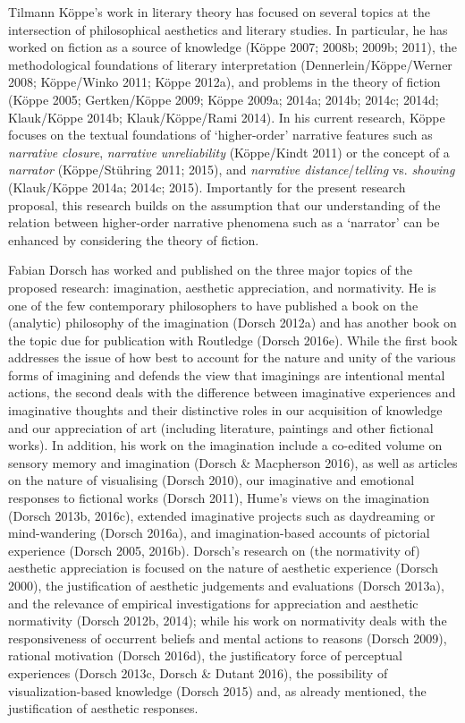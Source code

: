 \vspace{.2cm}
\noindent Tilmann K\"oppe's work in literary theory has focused on several topics at the intersection of philosophical aesthetics and literary studies. In particular, he has worked on fiction as a source of knowledge (K\"oppe 2007; 2008b; 2009b; 2011), the methodological foundations of literary interpretation (Dennerlein/K\"oppe/Werner 2008; K\"oppe/Winko 2011; K\"oppe 2012a), and problems in the theory of fiction (K\"oppe 2005; Gertken/K\"oppe 2009; K\"oppe 2009a; 2014a; 2014b; 2014c; 2014d; Klauk/K\"oppe 2014b; Klauk/K\"oppe/Rami 2014). In his current research, K\"oppe focuses on the textual foundations of `higher-order' narrative features such as \emph{narrative closure}, \emph{narrative unreliability} (K\"oppe/Kindt 2011) or the concept of a \emph{narrator} (K\"oppe/St\"uhring 2011; 2015), and \emph{narrative distance}/\emph{telling} vs. \emph{showing} (Klauk/K\"oppe 2014a; 2014c; 2015). Importantly for the present research proposal, this research builds on the assumption that our understanding of the relation between higher-order narrative phenomena such as a `narrator' can be enhanced by considering the theory of fiction.

\vspace{.2cm}
\noindent Fabian Dorsch has worked and published on the three major topics of the proposed research: imagination, aesthetic appreciation, and normativity. He is one of the few contemporary philosophers to have published a book on the (analytic) philosophy of the imagination (Dorsch 2012a) and has another book on the topic due for publication with Routledge (Dorsch 2016e). While the first book addresses the issue of how best to account for the nature and unity of the various forms of imagining and defends the view that imaginings are intentional mental actions, the second deals with the difference between imaginative experiences and imaginative thoughts and their distinctive roles in our acquisition of knowledge and our appreciation of art (including literature, paintings and other fictional works). In addition, his work on the imagination include a co-edited volume on sensory memory and imagination (Dorsch \& Macpherson 2016), as well as articles on the nature of visualising (Dorsch 2010), our imaginative and emotional responses to fictional works (Dorsch 2011), Hume's views on the imagination (Dorsch 2013b, 2016c), extended imaginative projects such as daydreaming or mind-wandering (Dorsch 2016a), and imagination-based accounts of pictorial experience (Dorsch 2005, 2016b). Dorsch's research on (the normativity of) aesthetic appreciation is focused on the nature of aesthetic experience (Dorsch 2000), the justification of aesthetic judgements and evaluations (Dorsch 2013a), and the relevance of empirical investigations for appreciation and aesthetic normativity (Dorsch 2012b, 2014); while his work on normativity deals with the responsiveness of occurrent beliefs and mental actions to reasons (Dorsch 2009), rational motivation (Dorsch 2016d), the justificatory force of perceptual experiences (Dorsch 2013c, Dorsch \& Dutant 2016), the possibility of visualization-based knowledge (Dorsch 2015) and, as already mentioned, the justification of aesthetic responses.